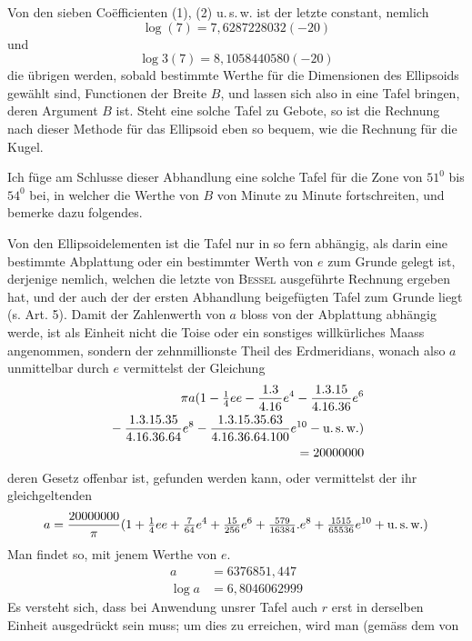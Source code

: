 %
Von den sieben Coëfficienten (1), (2) u.\,s.\,w. ist der letzte constant, nemlich
\[
\log(7)=7{,}6287228032(-20)
\]
und
\[
\log3(7)=8{,}1058440580(-20)
\]
die übrigen werden, sobald bestimmte Werthe für die Dimensionen des Ellipsoids gewählt sind, Functionen der Breite \(B\), und lassen sich also in eine Tafel bringen, deren Argument \(B\) ist. Steht eine solche Tafel zu Gebote, so ist die Rechnung nach dieser Methode für das Ellipsoid eben so bequem, wie die Rechnung für die Kugel.

Ich füge am Schlusse dieser Abhandlung eine solche Tafel für die Zone von \(51^0\) bis \(54^0\) bei, in welcher die Werthe von \(B\) von Minute zu Minute fortschreiten, und bemerke dazu folgendes.

Von den Ellipsoidelementen ist die Tafel nur in so fern abhängig, als darin eine bestimmte Abplattung oder ein bestimmter Werth von \(e\) zum Grunde gelegt ist, derjenige nemlich, welchen die letzte von \textsc{Bessel} ausgeführte Rechnung ergeben hat, und der auch der der ersten Abhandlung beigefügten Tafel zum Grunde liegt (s. Art. 5). Damit der Zahlenwerth von \(a\) bloss von der Abplattung abhängig werde, ist als Einheit nicht die Toise oder ein sonstiges willkürliches Maass angenommen, sondern der zehnmillionste Theil des Erdmeridians, wonach also \(a\) unmittelbar durch \(e\) vermittelst der Gleichung
\[
\begin{aligned}
\pi a(1-\tfrac14ee-\frac{1\mathord{.}3}{4\mathord{.}16}e^4-\frac{1\mathord{.}3\mathord{.}15}{4\mathord{.}16\mathord{.}36}e^6\\
{}-\frac{1\mathord{.}3\mathord{.}15\mathord{.}35}{4\mathord{.}16\mathord{.}36\mathord{.}64}e^8
-\frac{1\mathord{.}3\mathord{.}15\mathord{.}35\mathord{.}63}{4\mathord{.}16\mathord{.}36\mathord{.}64\mathord{.}100}e^{10}-\text{u.\,s.\,w.})\\
=20000000
\end{aligned}
\]
deren Gesetz offenbar ist, gefunden werden kann, oder vermittelst der ihr gleichgeltenden
\[
a=\frac{20000000}{\pi}(1+\tfrac14ee+\tfrac7{64}e^4+\tfrac{15}{256}e^6+\tfrac{579}{16384}\mathord{.}e^8+\tfrac{1515}{65536}e^{10}+\text{u.\,s.\,w.})
\]
Man findet so, mit jenem Werthe von \(e\).
\[
\begin{aligned}
a&=6376851{,}447\\
\log a&=6{,}8046062999
\end{aligned}
\]
Es versteht sich, dass bei Anwendung unsrer Tafel auch \(r\) erst in derselben Einheit ausgedrückt sein muss; um dies zu erreichen, wird man (gemäss dem von
